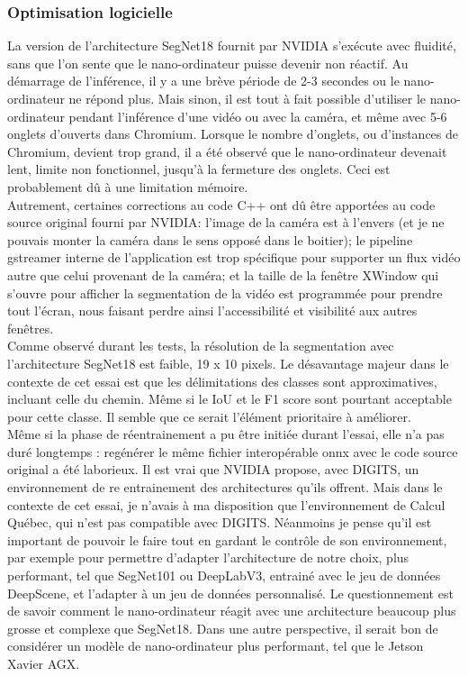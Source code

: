 \subsubsection{Optimisation logicielle}
\noindent La version de l'architecture SegNet18 fournit par NVIDIA s'exécute avec fluidité, sans que l'on sente que le nano-ordinateur puisse devenir non réactif. Au démarrage de l'inférence, il y a une brève période de 2-3 secondes ou le nano-ordinateur ne répond plus. Mais sinon, il est tout à fait possible d'utiliser le nano-ordinateur pendant l'inférence d'une vidéo ou avec la caméra, et même avec 5-6 onglets d'ouverts dans Chromium. Lorsque le nombre d'onglets, ou d'instances de Chromium, devient trop grand, il a été observé que le nano-ordinateur devenait lent, limite non fonctionnel, jusqu'à la fermeture des onglets. Ceci est probablement dû à une limitation mémoire.
\vspace{0.5\baselineskip}
\\
\noindent Autrement, certaines corrections au code C++ ont dû être apportées au code source original fourni par NVIDIA: l'image de la caméra est à l'envers (et je ne pouvais monter la caméra dans le sens opposé dans le boitier); le pipeline gstreamer interne de l'application est trop spécifique pour supporter un flux vidéo autre que celui provenant de la caméra; et la taille de la fenêtre XWindow qui s'ouvre pour afficher la segmentation de la vidéo est programmée pour prendre tout l'écran, nous faisant perdre ainsi l'accessibilité et visibilité aux autres fenêtres.
\vspace{0.5\baselineskip}
\\
\noindent Comme observé durant les tests, la résolution de la segmentation avec l'architecture SegNet18 est faible, 19 x 10 pixels. Le désavantage majeur dans le contexte de cet essai est que les délimitations des classes sont approximatives, incluant celle du chemin. Même si le IoU et le F1 score sont pourtant acceptable pour cette classe. Il semble que ce serait l'élément prioritaire à améliorer. 
\vspace{0.5\baselineskip}
\\
\noindent Même si la phase de réentrainement a pu être initiée durant l'essai, elle n'a pas duré longtemps : regénérer le même fichier interopérable \acrshort{onnx} avec le code source original a été laborieux. Il est vrai que NVIDIA propose, avec DIGITS, un environnement de re entrainement des architectures qu'ils offrent. Mais dans le contexte de cet essai, je n'avais à ma disposition que l'environnement de Calcul Québec, qui n'est pas compatible avec DIGITS. Néanmoins je pense qu'il est important de pouvoir le faire tout en gardant le contrôle de son environnement, par exemple pour permettre d'adapter l'architecture de notre choix, plus performant, tel que SegNet101 ou DeepLabV3, entrainé avec le jeu de données DeepScene, et l'adapter à un jeu de données personnalisé. Le questionnement est de savoir comment le nano-ordinateur réagit avec une architecture beaucoup plus grosse et complexe que SegNet18. Dans une autre perspective, il serait bon de considérer un modèle de nano-ordinateur plus performant, tel que le Jetson Xavier AGX.
